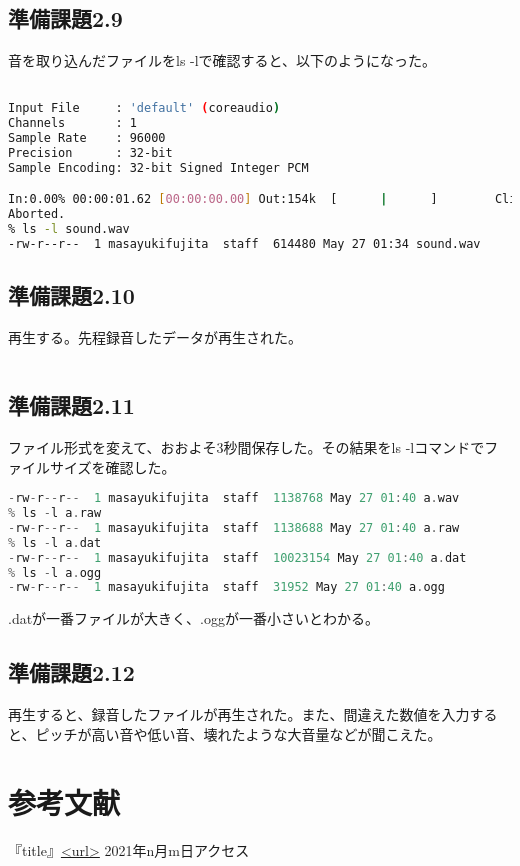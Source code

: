 \documentclass{ltjsarticle}
\begin{document}
\subsection{準備課題2.9}
音を取り込んだファイルをls -lで確認すると、以下のようになった。
\begin{lstlisting}[caption=recコマンド,language=bash]
% rec sound.wav

Input File     : 'default' (coreaudio)
Channels       : 1
Sample Rate    : 96000
Precision      : 32-bit
Sample Encoding: 32-bit Signed Integer PCM

In:0.00% 00:00:01.62 [00:00:00.00] Out:154k  [      |      ]        Clip:0    ^C
Aborted.
% ls -l sound.wav
-rw-r--r--  1 masayukifujita  staff  614480 May 27 01:34 sound.wav
\end{lstlisting}

\subsection{準備課題2.10}
再生する。先程録音したデータが再生された。
\begin{lstlisting}[caption=playコマンド,language=bash]
% play sound.wav
\end{lstlisting}

\subsection{準備課題2.11}
ファイル形式を変えて、おおよそ3秒間保存した。その結果をls -lコマンドでファイルサイズを確認した。
\begin{lstlisting}[caption=ファイル形式,language=C]
% ls -l a.wav
-rw-r--r--  1 masayukifujita  staff  1138768 May 27 01:40 a.wav
% ls -l a.raw
-rw-r--r--  1 masayukifujita  staff  1138688 May 27 01:40 a.raw
% ls -l a.dat
-rw-r--r--  1 masayukifujita  staff  10023154 May 27 01:40 a.dat
% ls -l a.ogg
-rw-r--r--  1 masayukifujita  staff  31952 May 27 01:40 a.ogg
\end{lstlisting}
.datが一番ファイルが大きく、.oggが一番小さいとわかる。

\subsection{準備課題2.12}
再生すると、録音したファイルが再生された。また、間違えた数値を入力すると、ピッチが高い音や低い音、壊れたような大音量などが聞こえた。


\section{参考文献}
『title』\url{<url>} 2021年n月m日アクセス
\end{document}
